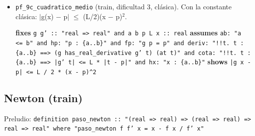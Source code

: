 \documentclass[11pt,a4paper]{article}
\begin{document}
\begin{itemize}
  {\footnotesize \textbf{fixes} \texttt{g g' :\allowbreak{}:\allowbreak{} "real =\allowbreak{}> real" and a b p L x :\allowbreak{}:\allowbreak{} real} \textbf{assumes} \texttt{ab:\allowbreak{} "a <=\allowbreak{} b" and hp:\allowbreak{} "p :\allowbreak{} \{a..b\}" and fp:\allowbreak{} "g p =\allowbreak{} p" and deriv:\allowbreak{} "!{}!t. t :\allowbreak{} \{a..b\} =\allowbreak{}=\allowbreak{}> (\allowbreak{}g has\_\allowbreak{}real\_\allowbreak{}derivative g' t) (\allowbreak{}at t)" and cota:\allowbreak{} "!{}!t. t :\allowbreak{} \{a..b\} =\allowbreak{}=\allowbreak{}> |\allowbreak{}g' t|\allowbreak{} <=\allowbreak{} L *\allowbreak{} |\allowbreak{}t -\allowbreak{} p|\allowbreak{}" and hx:\allowbreak{} "x :\allowbreak{} \{a..b\}"} \textbf{shows} \texttt{|\allowbreak{}g x -\allowbreak{} p|\allowbreak{} <=\allowbreak{} L *\allowbreak{} (\allowbreak{}x -\allowbreak{} p)\textasciicircum{}2}\par}
  \item \texttt{pf\_\allowbreak{}9c\_\allowbreak{}cuadratico\_\allowbreak{}medio} (train, dificultad 3, clásica). Con la constante clásica: $|$g(x) $-$ p$|$ $\le $ (L/2)(x $-$ p)$^{2}$.\\
  {\footnotesize \textbf{fixes} \texttt{g g' :\allowbreak{}:\allowbreak{} "real =\allowbreak{}> real" and a b p L x :\allowbreak{}:\allowbreak{} real} \textbf{assumes} \texttt{ab:\allowbreak{} "a <=\allowbreak{} b" and hp:\allowbreak{} "p :\allowbreak{} \{a..b\}" and fp:\allowbreak{} "g p =\allowbreak{} p" and deriv:\allowbreak{} "!{}!t. t :\allowbreak{} \{a..b\} =\allowbreak{}=\allowbreak{}> (\allowbreak{}g has\_\allowbreak{}real\_\allowbreak{}derivative g' t) (\allowbreak{}at t)" and cota:\allowbreak{} "!{}!t. t :\allowbreak{} \{a..b\} =\allowbreak{}=\allowbreak{}> |\allowbreak{}g' t|\allowbreak{} <=\allowbreak{} L *\allowbreak{} |\allowbreak{}t -\allowbreak{} p|\allowbreak{}" and hx:\allowbreak{} "x :\allowbreak{} \{a..b\}"} \textbf{shows} \texttt{|\allowbreak{}g x -\allowbreak{} p|\allowbreak{} <=\allowbreak{} L /\allowbreak{} 2 *\allowbreak{} (\allowbreak{}x -\allowbreak{} p)\textasciicircum{}2}\par}
\end{itemize}

\subsection{Newton (train)}

{\footnotesize Preludio: \texttt{definition paso\_\allowbreak{}newton :\allowbreak{}:\allowbreak{} "(\allowbreak{}real =\allowbreak{}> real) =\allowbreak{}> (\allowbreak{}real =\allowbreak{}> real) =\allowbreak{}> real =\allowbreak{}> real" where "paso\_\allowbreak{}newton f f' x =\allowbreak{} x -\allowbreak{} f x /\allowbreak{} f' x"}\par}
\end{document}
